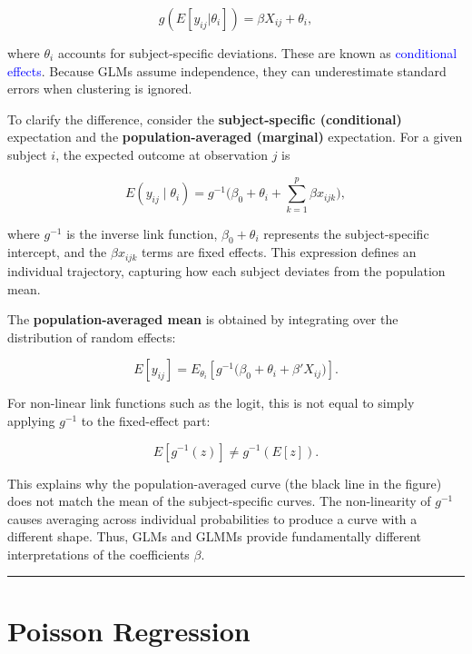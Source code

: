 \documentclass[
  letterpaper,
  DIV=11,
  numbers=noendperiod]{scrreprt}
\begin{document}
\[
g(E[y_{ij}|\theta_i]) = \beta X_{ij} + \theta_i,                                       \]

where \(\theta_i\) accounts for subject-specific deviations. These are
known as \textcolor{blue}{conditional effects}. Because GLMs assume
independence, they can underestimate standard errors when clustering is
ignored.

To clarify the difference, consider the \textbf{subject-specific
(conditional)} expectation and the \textbf{population-averaged
(marginal)} expectation. For a given subject \(i\), the expected outcome
at observation \(j\) is

\[
E(y_{ij} \mid \theta_i) = g^{-1} \big( \beta_0 + \theta_i + \sum_{k=1}^p \beta x_{ijk} \big),                                                                                 \]

where \(g^{-1}\) is the inverse link function, \(\beta_0 + \theta_i\)
represents the subject-specific intercept, and the \(\beta x_{ijk}\)
terms are fixed effects. This expression defines an individual
trajectory, capturing how each subject deviates from the population
mean.

The \textbf{population-averaged mean} is obtained by integrating over
the distribution of random effects:

\[ 
E[y_{ij}] = E_{\theta_i} \left[ g^{-1} \big( \beta_0 + \theta_i + \beta'X_{ij} \big) \right].
\]

For non-linear link functions such as the logit, this is not equal to
simply applying \(g^{-1}\) to the fixed-effect part:

\[
E[g^{-1}(z)] \neq g^{-1}(E[z]).                                                         \]

This explains why the population-averaged curve (the black line in the
figure) does not match the mean of the subject-specific curves. The
non-linearity of \(g^{-1}\) causes averaging across individual
probabilities to produce a curve with a different shape. Thus, GLMs and
GLMMs provide fundamentally different interpretations of the
coefficients \(\beta\).

\begin{center}\rule{0.5\linewidth}{0.5pt}\end{center}

\hypertarget{poisson-regression-1}{%
\section*{Poisson Regression}\label{poisson-regression-1}}
\end{document}
